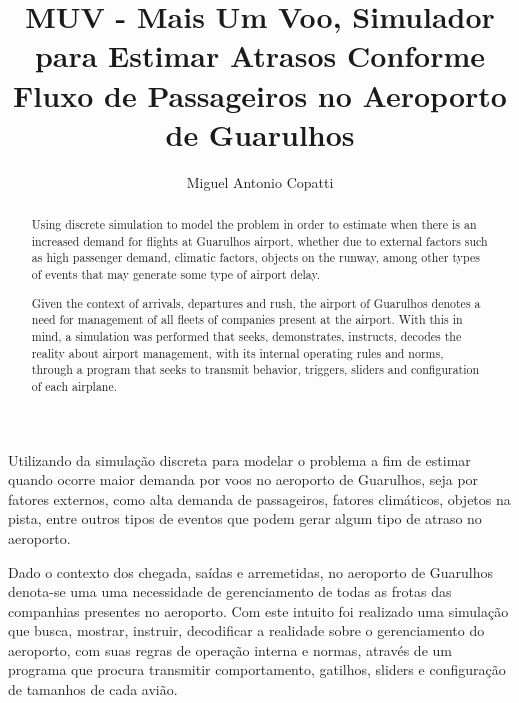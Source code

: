\documentclass[12pt]{article}
\title{MUV - Mais Um Voo, Simulador para Estimar Atrasos Conforme Fluxo de
    Passageiros no Aeroporto de Guarulhos}
\author{Miguel Antonio Copatti\inst{1}}
\begin{document}
 
  
  \maketitle
  
  \begin{abstract}
    Using discrete simulation to model the problem in order to estimate when there is
    an increased demand for flights at Guarulhos airport, whether due to external
    factors such as high passenger demand, climatic factors, objects on the runway,
    among other types of events that may generate some type of airport delay.
  
    Given the context of arrivals, departures and rush, the airport of Guarulhos denotes 
    a need for management of all fleets of companies present at the airport.
    With this in mind, a simulation was performed that seeks, demonstrates,
    instructs, decodes the reality about airport management, with its internal operating
    rules and norms, through a program that seeks to transmit behavior, triggers, sliders
    and configuration of each airplane.
    
  \end{abstract}
       
  \begin{resumo} 
  
  
  
    Utilizando da simulação discreta para modelar o problema a fim de estimar quando ocorre maior
    demanda por voos no aeroporto de Guarulhos, seja por fatores externos, como alta demanda de 
    passageiros, fatores climáticos, objetos na pista, entre outros tipos de eventos que podem 
    gerar algum tipo de atraso no aeroporto.
  
    Dado o contexto dos chegada, saídas e arremetidas, no aeroporto de Guarulhos denota-se uma
    uma necessidade de gerenciamento de todas as frotas das companhias presentes no aeroporto.
    Com este intuito foi realizado uma simulação que busca, mostrar, instruir, decodificar a
    realidade sobre o gerenciamento do aeroporto, com suas regras de operação interna e normas, 
    através de um programa que procura transmitir comportamento, gatilhos, sliders e configuração
    de tamanhos de cada avião.
   
  
  \end{resumo}
  
\end{document}
